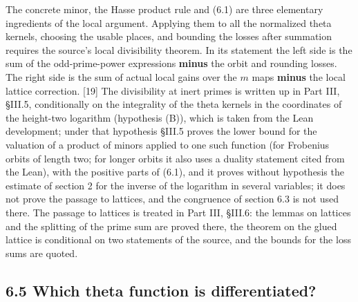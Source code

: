 \documentclass[11pt,letterpaper]{article}
\begin{document}
{The concrete minor, the Hasse product rule and (6.1) are three elementary ingredients of the local argument. Applying them to all the normalized theta kernels, choosing the usable places, and bounding the losses after summation requires the source's local divisibility theorem. In its statement the left side is the sum of the odd-prime-power expressions \textbf{minus} the orbit and rounding losses. The right side is the sum of actual local gains over the $m$ maps \textbf{minus} the local lattice correction. [19] The divisibility at inert primes is written up in Part III, \S III.5, conditionally on the integrality of the theta kernels in the coordinates of the height-two logarithm (hypothesis (B)), which is taken from the Lean development; under that hypothesis \S III.5 proves the lower bound for the valuation of a product of minors applied to one such function (for Frobenius orbits of length two; for longer orbits it also uses a duality statement cited from the Lean), with the positive parts of (6.1), and it proves without hypothesis the estimate of section 2 for the inverse of the logarithm in several variables; it does not prove the passage to lattices, and the congruence of section 6.3 is not used there. The passage to lattices is treated in Part III, \S III.6: the lemmas on lattices and the splitting of the prime sum are proved there, the theorem on the glued lattice is conditional on two statements of the source, and the bounds for the loss sums are quoted.

\newpage
\subsection*{6.5 Which theta function is differentiated?}

}
\end{document}
